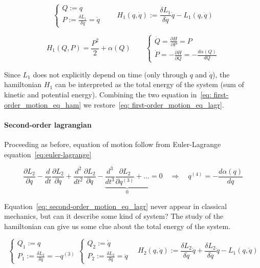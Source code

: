 \begin{equation*}
  \begin{cases}
    Q := q \\
    P := \frac{\delta L_1}{\delta \dot{q}} = \dot{q}
  \end{cases}
  \qquad
  H_1(q, \dot{q}) := \frac{\delta L_1}{\delta \dot{q}} \dot{q} - L_1(q, \dot{q})
\end{equation*}

\begin{equation} \label{eq: first-order_motion_eq_ham}
  H_1(Q, P) = \frac{P^2}{2} + \alpha(Q) \qquad
  \begin{cases}
    \dot{Q} =   \frac{\partial H}{\partial P} = P \\
    \dot{P} = - \frac{\partial H}{\partial Q} = - \frac{d\alpha(Q)}{dQ}
  \end{cases}
\end{equation}

Since $L_1$ does not explicitly depend on time (only through $q$ and $\dot{q}$),
the hamiltonian $H_1$ can be interpreted as the total energy of the system (sum of
kinetic and potential energy). Combining the two equation in~\eqref{eq:
first-order_motion_eq_ham} we restore~\eqref{eq: first-order_motion_eq_lagr}.


\paragraph{Second-order lagrangian} Proceeding as before, equation of motion
follow from Euler-Lagrange equation~\eqref{eq:euler-lagrange}

\begin{equation} \label{eq: second-order_motion_eq_lagr}
  \frac{\partial L_2}{\partial q} -
  \frac{d}{dt}\frac{\partial L_2}{\partial \dot{q}} +
  \frac{d^2}{dt^2}\frac{\partial L_2}{\partial \ddot{q}} -
  \underbrace{
    \frac{d^3}{dt^3}\frac{\partial L_2}{\partial q^{(3)}} + \ldots
  }_0 = 0
  \quad \Rightarrow \quad
  q^{(4)} = - \frac{d\alpha(q)}{dq}
\end{equation}

Equation~\eqref{eq: second-order_motion_eq_lagr} never appear in classical
mechanics, but can it describe some kind of system? The study of the hamiltonian
can give us some clue about the total energy of the system.

\begin{equation*}
  \begin{cases}
    Q_1 := q \\
    P_1 := \frac{\delta L_2}{\delta \dot{q}} = -q^{(3)}
  \end{cases}
  \begin{cases}
    Q_2 := \dot{q} \\
    P_2 := \frac{\delta L_2}{\delta \ddot{q}} = \ddot{q}
  \end{cases}
  \quad
  H_2(q, \dot{q}) :=
    \frac{\delta L_2}{\delta \dot{q}} \dot{q} +
    \frac{\delta L_2}{\delta \ddot{q}} \ddot{q} -
    L_1(q, \dot{q})
\end{equation*}

